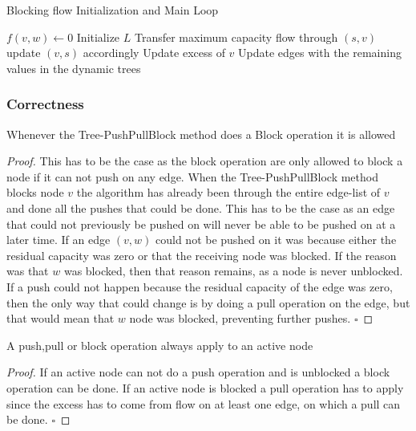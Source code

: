 \begin{algorithm}
	\caption{Blocking flow Initialization and Main Loop}\label{BFInitMain}
\begin{algorithmic}[1]
\Statex
{}
		\State $f(v,w) \gets 0$
	\EndFor
	\State {}
	\State Initialize $L$
		\State Transfer maximum capacity flow through $(s,v)$ update $(v,s)$ accordingly
		\State Update excess of $v$
	\EndFor
	 
		\State {}
	\EndWhile
	\State Update edges with the remaining values in the dynamic trees
\EndFunction
\end{algorithmic}
\end{algorithm}

\clearpage
\subsubsection{Correctness}
\begin{lemma}
	Whenever the Tree-PushPullBlock method does a Block operation it is allowed
\end{lemma}
\begin{proof}
This has to be the case as the block operation are only allowed to block a node if it can not push on any edge.
When the Tree-PushPullBlock method blocks node $v$ the algorithm has already been through the entire edge-list of $v$ and done all the
pushes that could be done. This has to be the case as an edge that could not previously be pushed on will never be able to be pushed on at a later time. 
If an edge $(v,w)$ could not be pushed on it was because either the residual capacity was zero or that the receiving node was blocked. If the reason was that $w$ was blocked,
then that reason remains, as a node is never unblocked. 
If a push could not happen because the residual capacity of the edge was zero,
then the only way that could change is by doing a pull operation on the edge, but that would mean that $w$ node was blocked, preventing further pushes.
$\square$
\end{proof}
	
\begin{lemma}
	A push,pull or block operation always apply to an active node
\end{lemma}
\begin{proof}
	If an active node can not do a push operation and is unblocked a block operation can be done. If an active node is blocked a pull operation has to apply
	since the excess has to come from flow on at least one edge, on which a pull can be done. $\square$
\end{proof}

